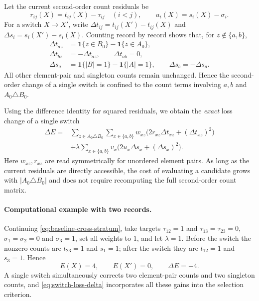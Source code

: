 \documentclass[11pt,a4paper]{article}
\numberwithin{equation}{section}
\theoremstyle{definition}
\numberwithin{algorithm}{section}
\begin{document}
Let the current second-order count residuals be
\begin{equation}
r_{ij}(X)=t_{ij}(X)-\tau_{ij}\quad(i<j),\qquad
u_i(X)=s_i(X)-\sigma_i.
\label{eq:baseline-residuals}
\end{equation}
For a switch $X\to X'$, write
$\Delta t_{ij}=t_{ij}(X')-t_{ij}(X)$ and
$\Delta s_i=s_i(X')-s_i(X)$.
Counting record by record shows that, for $z\notin\{a,b\}$,
\begin{equation}
\begin{aligned}
\Delta t_{az}
&=\mathbf1\{z\in B_0\}-\mathbf1\{z\in A_0\},\\
\Delta t_{bz}
&=-\Delta t_{az},\qquad \Delta t_{ab}=0,\\
\Delta s_a
&=\mathbf1\{|B|=1\}-\mathbf1\{|A|=1\},
\qquad \Delta s_b=-\Delta s_a .
\end{aligned}
\label{eq:switch-local-change}
\end{equation}
All other element-pair and singleton counts remain unchanged.
Hence the second-order change of a single switch is confined to the count terms involving
$a,b$ and $A_0\triangle B_0$.

Using the difference identity for squared residuals, we obtain the \emph{exact} loss change
of a single switch
\begin{equation}
\boxed{
\begin{aligned}
\Delta E
={}&\sum_{z\in A_0\triangle B_0}
\sum_{x\in\{a,b\}}
w_{xz}\bigl(2r_{xz}\Delta t_{xz}+(\Delta t_{xz})^2\bigr)\\
&+\lambda\sum_{x\in\{a,b\}}
v_x\bigl(2u_x\Delta s_x+(\Delta s_x)^2\bigr).
\end{aligned}
}
\label{eq:switch-loss-delta}
\end{equation}
Here $w_{xz},r_{xz}$ are read symmetrically for unordered element pairs.
As long as the current residuals are directly accessible, the cost of evaluating a candidate
grows with $|A_0\triangle B_0|$ and does not require recomputing the full second-order count
matrix.

\paragraph{Computational example with two records.}
Continuing \eqref{eq:baseline-cross-stratum}, take targets $\tau_{12}=1$ and
$\tau_{13}=\tau_{23}=0$,
$\sigma_1=\sigma_2=0$ and $\sigma_3=1$,
set all weights to $1$, and let $\lambda=1$.
Before the switch the nonzero counts are $t_{23}=1$ and $s_1=1$;
after the switch they are $t_{12}=1$ and $s_3=1$.
Hence
\begin{equation}
E(X)=4,\qquad E(X')=0,\qquad\Delta E=-4.
\label{eq:baseline-swap-example}
\end{equation}
A single switch simultaneously corrects two element-pair counts and two singleton counts,
and \eqref{eq:switch-loss-delta} incorporates all these gains into the selection criterion.
\end{document}
